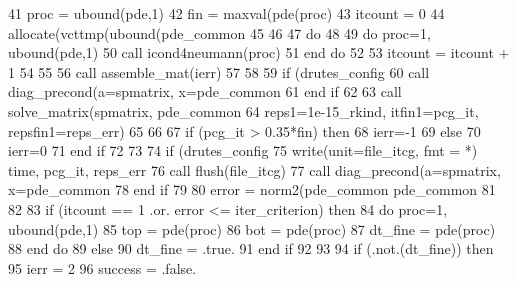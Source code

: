 \begin{DoxyCode}
41       proc = ubound(pde,1)
42       fin = maxval(pde(proc)%
43       itcount = 0
44       \textcolor{keyword}{allocate}(vcttmp(ubound(pde_common%
45       
46 
47       \textcolor{keywordflow}{do}
48 
49         \textcolor{keywordflow}{do} proc=1, ubound(pde,1)
50           \textcolor{keyword}{call }icond4neumann(proc)
51 \textcolor{keywordflow}{        end do}
52 
53         itcount = itcount + 1
54 
55         
56         \textcolor{keyword}{call }assemble_mat(ierr)
57 
58         
59         \textcolor{keywordflow}{if} (drutes_config%
60           \textcolor{keyword}{call }diag_precond(a=spmatrix, x=pde_common%
61 \textcolor{keywordflow}{        end if}
62 
63         \textcolor{keyword}{call }solve_matrix(spmatrix, pde_common%
64 \textcolor{comment}{                  reps1=1e-15\_rkind, itfin1=pcg\_it, repsfin1=reps\_err)}
65 \textcolor{comment}{                  }
66 \textcolor{comment}{                  }
67 \textcolor{comment}{        }\textcolor{keywordflow}{if} (pcg\_it > 0.35*fin) \textcolor{keywordflow}{then} 
68           ierr=-1
69         \textcolor{keywordflow}{else}
70           ierr=0
71 \textcolor{keywordflow}{        end if}
72                   
73 
74         \textcolor{keywordflow}{if} (drutes_config%
75           \textcolor{keyword}{write}(unit=file_itcg, fmt = *) time, pcg\_it, reps\_err
76           \textcolor{keyword}{call }flush(file_itcg)
77           \textcolor{keyword}{call }diag_precond(a=spmatrix, x=pde_common%
78 \textcolor{keywordflow}{        end if}  
79 
80         error = norm2(pde_common%
      pde_common%
81 \textcolor{comment}{        }
82 \textcolor{comment}{         }
83 \textcolor{comment}{        }\textcolor{keywordflow}{if} (itcount == 1 .or. error <= iter_criterion) \textcolor{keywordflow}{then}
84           \textcolor{keywordflow}{do} proc=1, ubound(pde,1)
85             top = pde(proc)%
86             bot = pde(proc)%
87             dt\_fine = pde(proc)%
88 \textcolor{keywordflow}{          end do}
89         \textcolor{keywordflow}{else}
90           dt\_fine = .true.
91 \textcolor{keywordflow}{        end if}
92 
93 
94         \textcolor{keywordflow}{if} (.not.(dt\_fine)) \textcolor{keywordflow}{then}
95           ierr = 2
96           success = .false.

\end{DoxyCode}
